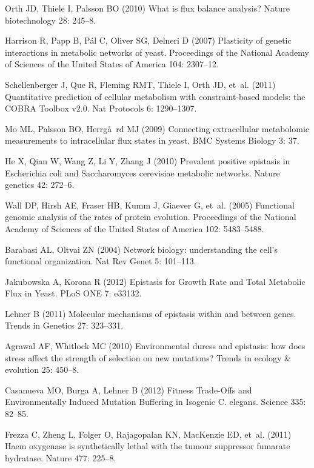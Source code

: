 \documentclass[10pt]{article}
\begin{document}
\begin{thebibliography}{10}
Orth JD, Thiele I, Palsson BO (2010) {What is flux balance analysis?}
\newblock Nature biotechnology 28: 245--8.

Harrison R, Papp B, P\'{a}l C, Oliver SG, Delneri D (2007) {Plasticity of
  genetic interactions in metabolic networks of yeast.}
\newblock Proceedings of the National Academy of Sciences of the United States
  of America 104: 2307--12.

Schellenberger J, Que R, Fleming RMT, Thiele I, Orth JD, et~al. (2011)
  {Quantitative prediction of cellular metabolism with constraint-based models:
  the COBRA Toolbox v2.0}.
\newblock Nat Protocols 6: 1290--1307.

Mo ML, Palsson BO, Herrg\aa~rd MJ (2009) {Connecting extracellular metabolomic
  measurements to intracellular flux states in yeast}.
\newblock BMC Systems Biology 3: 37.

He X, Qian W, Wang Z, Li Y, Zhang J (2010) {Prevalent positive epistasis in
  Escherichia coli and Saccharomyces cerevisiae metabolic networks.}
\newblock Nature genetics 42: 272--6.

Wall DP, Hirsh AE, Fraser HB, Kumm J, Giaever G, et~al. (2005) {Functional
  genomic analysis of the rates of protein evolution}.
\newblock Proceedings of the National Academy of Sciences of the United States
  of America 102: 5483--5488.

Barabasi AL, Oltvai ZN (2004) {Network biology: understanding the cell's
  functional organization}.
\newblock Nat Rev Genet 5: 101--113.

Jakubowska A, Korona R (2012) {Epistasis for Growth Rate and Total Metabolic
  Flux in Yeast}.
\newblock PLoS ONE 7: e33132.

Lehner B (2011) {Molecular mechanisms of epistasis within and between genes}.
\newblock Trends in Genetics 27: 323--331.

Agrawal AF, Whitlock MC (2010) {Environmental duress and epistasis: how does
  stress affect the strength of selection on new mutations?}
\newblock Trends in ecology \& evolution 25: 450--8.

Casanueva MO, Burga A, Lehner B (2012) {Fitness Trade-Offs and Environmentally
  Induced Mutation Buffering in Isogenic C. elegans}.
\newblock Science 335: 82--85.

Frezza C, Zheng L, Folger O, Rajagopalan KN, MacKenzie ED, et~al. (2011) {Haem
  oxygenase is synthetically lethal with the tumour suppressor fumarate
  hydratase.}
\newblock Nature 477: 225--8.


\end{thebibliography}
\end{document}
